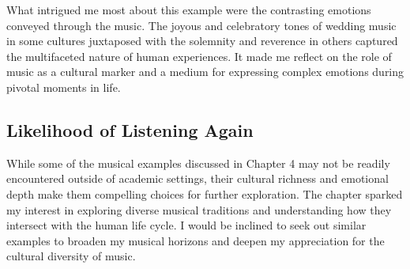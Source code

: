 What intrigued me most about this example were the contrasting emotions conveyed through the music. The joyous and celebratory tones of wedding music in some cultures juxtaposed with the solemnity and reverence in others captured the multifaceted nature of human experiences. It made me reflect on the role of music as a cultural marker and a medium for expressing complex emotions during pivotal moments in life.

\subsection{Likelihood of Listening Again}

While some of the musical examples discussed in Chapter 4 may not be readily encountered outside of academic settings, their cultural richness and emotional depth make them compelling choices for further exploration. The chapter sparked my interest in exploring diverse musical traditions and understanding how they intersect with the human life cycle. I would be inclined to seek out similar examples to broaden my musical horizons and deepen my appreciation for the cultural diversity of music.